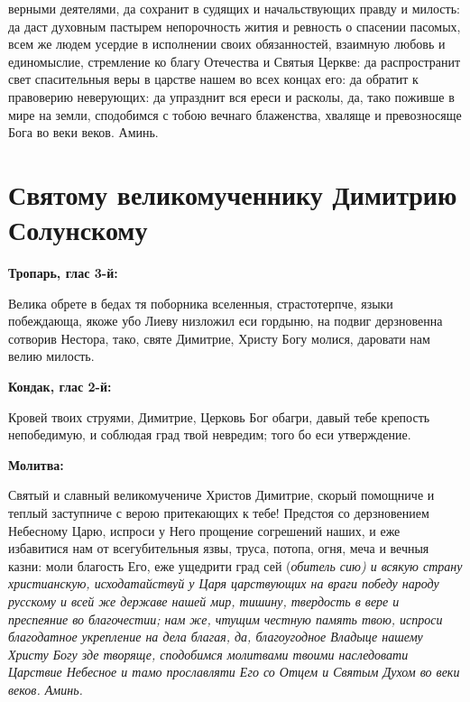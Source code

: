 верными деятелями, да сохранит в судящих и начальствующих правду и милость: да даст духовным пастырем непорочность жития и ревность о спасении пасомых, всем же людем усердие в исполнении своих обязанностей, взаимную любовь и единомыслие, стремление ко благу Отечества и Святыя Церкве: да распространит свет спасительныя веры в царстве нашем во всех концах его: да обратит к правоверию неверующих: да упразднит вся ереси и расколы, да, тако поживше в мире на земли, сподобимся с тобою вечнаго блаженства, хваляще и превозносяще Бога во веки веков. Аминь.


\section{Святому великомученнику Димитрию Солунскому}
 


\bfseries Тропарь, глас 3-й:\normalfont{}\nopagebreak


Велика обрете в бедах тя поборника вселенныя, страстотерпче, языки побеждающа, якоже убо Лиеву низложил еси гордыню, на подвиг дерзновенна сотворив Нестора, тако, святе Димитрие, Христу Богу молися, даровати нам велию милость.


\medskip


\bfseries Кондак, глас 2-й:\normalfont{}\nopagebreak


Кровей твоих струями, Димитрие, Церковь Бог обагри, давый тебе крепость непобедимую, и соблюдая град твой невредим; того бо еси утверждение.


\medskip


\bfseries Молитва:\normalfont{}\nopagebreak


Святый и славный великомучениче Христов Димитрие, скорый помощниче и теплый заступниче с верою притекающих к тебе! Предстоя со дерзновением Небесному Царю, испроси у Него прощение согрешений наших, и еже избавитися нам от всегубительныя язвы, труса, потопа, огня, меча и вечныя казни: моли благость Его, еже ущедрити град сей (\itshape обитель сию\normalfont{}) и всякую страну христианскую, исходатайствуй у Царя царствующих на враги победу народу русскому и всей же державе нашей мир, тишину, твердость в вере и преспеяние во благочестии; нам же, чтущим честную память твою, испроси благодатное укрепление на дела благая, да, благоугодное Владыце нашему Христу Богу зде творяще, сподобимся молитвами твоими наследовати Царствие Небесное и тамо прославляти Его со Отцем и Святым Духом во веки веков. Аминь.



